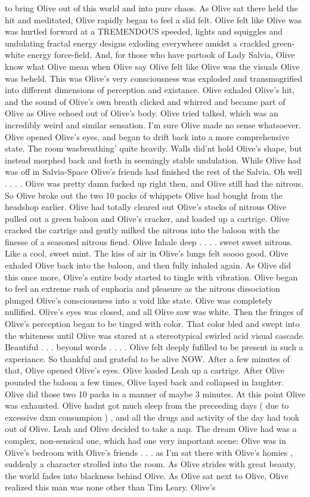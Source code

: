 \documentclass[12pt]{book}
\begin{document}
to bring Olive out of this world and into pure chaos. As Olive sat there held the hit and meditated, Olive rapidly began to feel a slid felt. Olive felt like Olive was was hurtled forward at a TREMENDOUS speeded, lights and squiggles and undulating fractal energy designs exloding everywhere amidst a crackled green-white energy force-field. And, for those who have partook of Lady Salvia, Olive know what Olive mean when Olive say Olive felt like Olive was the visuals Olive was beheld. This was Olive's very consciousness was exploded and transmogrified into different dimensions of perception and existance. Olive exhaled Olive's hit, and the sound of Olive's own breath clicked and whirred and became part of Olive as Olive echoed out of Olive's body. Olive tried talked, which was an incredibly weird and similar sensation. I'm sure Olive made no sense whatsoever. Olive opened Olive's eyes, and began to drift back into a more comprehensive state. The room wasbreathing' quite heavily. Walls did'nt hold Olive's shape, but instead morphed back and forth in seemingly stable undulation. While Olive had was off in Salvia-Space Olive's friends had finished the rest of the Salvia. Oh well . . .  . Olive was pretty damn fucked up right then, and Olive still had the nitrous. So Olive broke out the two 10 packs of whippets Olive had bought from the headshop earlier. Olive had totally cleared out Olive's stocks of nitrous Olive pulled out a green baloon and Olive's cracker, and loaded up a cartrige. Olive cracked the cartrige and gently milked the nitrous into the baloon with the finesse of a seasoned nitrous fiend. Olive Inhale deep . . .  . sweet sweet nitrous. Like a cool, sweet mint. The kiss of air in Olive's lungs felt soooo good. Olive exhaled Olive back into the baloon, and then fully inhaled again. As Olive did this once more, Olive's entire body started to tingle with vibration. Olive began to feel an extreme rush of euphoria and pleasure as the nitrous dissociation plunged Olive's consciousness into a void like state. Olive was completely nullified. Olive's eyes was closed, and all Olive saw was white. Then the fringes of Olive's perception began to be tinged with color. That color bled and swept into the whiteness until Olive was stared at a stereotypical swirled acid visual cascade. Beautiful . . .  beyond words . . .  . Olive felt deeply fufilled to be present in such a experiance. So thankful and grateful to be alive NOW. After a few minutes of that, Olive opened Olive's eyes. Olive loaded Leah up a cartrige. After Olive pounded the baloon a few times, Olive layed back and collapsed in laughter. Olive did those two 10 packs in a manner of maybe 3 minutes. At this point Olive was exhausted. Olive hadnt got much sleep from the preceeding days (  due to excessive dxm consumpion  ) , and all the drugs and activity of the day had took out of Olive. Leah and Olive decided to take a nap. The dream Olive had was a complex, non-sensical one, which had one very important scene: Olive was in Olive's bedroom with Olive's friends . . .  as I'm sat there with Olive's homies , suddenly a character strolled into the room. As Olive strides with great beauty, the world fades into blackness behind Olive. As Olive sat next to Olive, Olive realized this man was none other than Tim Leary. Olive's 
\end{document}
